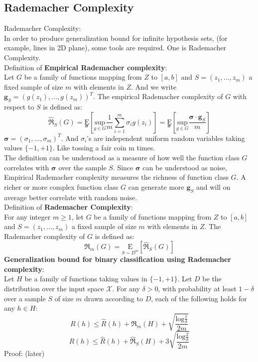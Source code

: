\documentclass[12pt]{article}
\theoremstyle{definition}
\theoremstyle{remark}
\numberwithin{equation}{section}
\begin{document}
\subsection{Rademacher Complexity}
Rademacher Complexity: \\[0.2cm]
In order to produce generalization bound for infinite hypothesis sets, (for example, lines in 2D plane), some tools are required. One is Rademacher Complexity. \\[0.2cm]
Definition of \textbf{Empirical Rademacher complexity}: \\[0.2cm]
Let $G$ be a family of functions mapping from $Z$ to $[a,b]$ and $S=(z_1,\dots,z_m)$ a fixed sample of size $m$ with elements in $Z$. And we write $\mathbf{g}_S = (g(z_1),\dots,g(z_m))^T$. The empirical Rademacher complexity of $G$ with respect to $S$ is defined as:
\[\mathfrak{\widehat{R}}_S(G)=\underset{\mathbf{\sigma}}{\text{E}}[\underset{g \in G}{\text{sup}}\frac{1}{m}\sum_{i=1}^{m}\sigma_ig(z_i)]=\underset{\mathbf{\sigma}}{\text{E}}[\underset{g \in G}{\text{sup}}\frac{\mathbf{\sigma}\cdot\mathbf{g}_S}{m}]\]
$\mathbf{\sigma} = (\sigma_1,\dots, \sigma_m)^T$. And $\sigma_i$'s are independent uniform random variables taking values $\{-1,+1\}$. Like tossing a fair coin m times. \\[0.2cm]
The definition can be understood as a measure of how well the function class $G$ correlates with $\mathbf{\sigma}$ over the sample $S$. Since $\mathbf{\sigma}$ can be understood as noise, Empirical Rademacher complexity measures the richness of function class $G$. A richer or more complex function class $G$ can generate more $\mathbf{g}_S$ and will on average better correlate with random noise.\\[0.2cm]
Definition of \textbf{Rademacher Complexity}: \\[0.2cm]
For any integer $m\geq 1$, let $G$ be a family of functions mapping from $Z$ to $[a,b]$ and $S=(z_1,\dots,z_m)$ a fixed sample of size $m$ with elements in $Z$. The Rademacher complexity of $G$ is defined as:
\[\mathfrak{R}_m(G)=\underset{S \sim D^m}{\text{E}}[\mathfrak{\widehat{R}}_S(G)]\]
\textbf{Generalization bound for binary classification using Rademacher complexity}:\\[0.2cm]
Let $H$ be a family of functions taking values in $\{-1,+1\}$. Let $D$ be the distribution over the input space $\mathcal{X}$. For any $\delta > 0$, with probability at least $1-\delta$ over a sample $S$ of size $m$ drawn according to $D$, each of the following holds for any $h \in H$:
\[R(h)\leq \widehat{R}(h) + \mathfrak{R}_m(H) + \sqrt{\frac{\mathrm{log}\frac{1}{\delta}}{2m}}\]
\[R(h)\leq \widehat{R}(h) + \mathfrak{\widehat{R}}_S(H) + 3\sqrt{\frac{\mathrm{log}\frac{2}{\delta}}{2m}}\]
Proof: (later)
\end{document}
